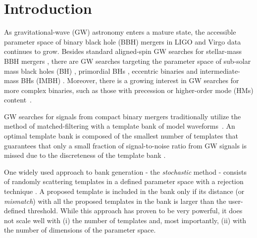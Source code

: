 \documentclass[twocolumn,showpacs,preprintnumbers,nofootinbib,prd,
superscriptaddress,10pt]{revtex4-2}
\begin{document}
\section{Introduction}

As gravitational-wave (GW) astronomy enters a mature state, the accessible parameter space of binary black hole (BBH) mergers in LIGO \cite{LIGOScientific:2014pky} and Virgo \cite{VIRGO:2014yos} data continues to grow. Besides standard aligned-spin GW searches for stellar-mass BBH mergers \cite{LIGOScientific:2018mvr, LIGOScientific:2020ibl, LIGOScientific:2021usb, KAGRA:2021vkt}, there are GW searches targeting the parameter space of sub-solar mass black holes (BH) \cite{SSM_O2, SSM_O3a, PhysRevD.106.023024}, primordial BHs \cite{Nitz:2021mzz}, eccentric binaries \cite{PhysRevD.102.043005, PhysRevD.104.104016, Nitz:2019spj, LIGOScientific:2019dag, Ramos-Buades:2020eju, Wang:2021qsu, Nitz:2021mzz} and intermediate-mass BHs (IMBH) \cite{IMBH_O2, IMBH_O3, Chandra:2022ixv}. Moreover, there is a growing interest in GW searches for more complex binaries, such as those with precession \cite{PhysRevD.89.024010, Harry:2017weg, PhysRevD.102.041302, Indik:2016qky, Harry:2016ijz, Fairhurst:2019vut, McIsaac:2023ijd} or higher-order mode (HMs) content~\cite{CalderonBustillo:2015lrt, Harry:2017weg, Chandra_hom, 2021PhRvD.103b4042M, Wadekar:2023kym}.

GW searches for signals from compact binary mergers traditionally utilize the method of matched-filtering with a template bank of model waveforms~\cite{Sathyaprakash:1991mt, Dhurandhar:1992mw, Owen:1998dk, Allen:2005fk, Babak:2006ty, Cokelaer:2007mv}.
An optimal template bank is composed of the smallest number of templates that guarantees that only a small fraction of signal-to-noise ratio from GW signals is missed due to the discreteness of the template bank \cite{Prix:2007ks}.

One widely used approach to bank generation - the {\it stochastic} method \cite{Harry:2009ea, PhysRevD.80.104014, Ajith:2012mn} - consists of randomly scattering templates in a defined parameter space with a rejection technique \cite{DalCanton:2017ala, Mukherjee:2018yra, Indik:2016qky, Lenon:2021zac}. A proposed template is included in the bank only if its distance (or {\it mismatch}) with all the proposed templates in the bank is larger than the user-defined threshold.
While this approach has proven to be very powerful, it does not scale well with (i) the number of templates and, most importantly, (ii) with the number of dimensions of the parameter space.
\end{document}
